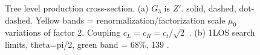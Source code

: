 \documentclass[../thesis.tex]{subfiles}
\begin{document}
\begin{figure}[!htb]
\centering
{}
\caption[Caption]{\label{fig:theory:1}Tree level production cross-section. (a) $G_3$ is $Z'$. \ttZp solid, \tjZp dashed, \tWZp dot-dashed. Yellow bands = renormalization/factorization scale $\mu_0$ variations of factor 2. Coupling $c_L=c_R=c_t/\sqrt{2}$ \citep{theory:ttZp}. (b) \ttZp 1LOS search limits, theta=pi/2, green band = 68\%, 139 \fb \citep{theory:ttZp_1los}.}
\end{figure}

\end{document}
